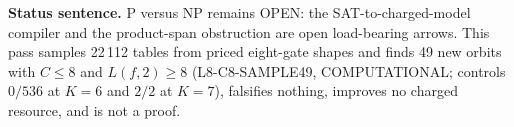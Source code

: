 \documentclass[11pt]{article}
\begin{document}
\bigskip
\noindent\textbf{Status sentence.} P versus NP remains OPEN: the SAT-to-charged-model compiler and the product-span obstruction are open load-bearing arrows. This pass samples 22\,112 tables from priced eight-gate shapes and finds 49 new orbits with $C\le8$ and $L(f,2)\ge8$ (L8-C8-SAMPLE49, COMPUTATIONAL; controls $0/536$ at $K=6$ and $2/2$ at $K=7$), falsifies nothing, improves no charged resource, and is not a proof.
\end{document}
